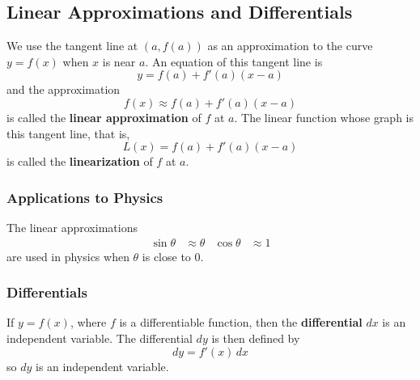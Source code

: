 \subsection{Linear Approximations and Differentials}

We use the tangent line at \((a,f(a))\) as an approximation to the curve
\(y=f(x)\) when \(x\) is near \(a\).
An equation of this tangent line is
\[y=f(a)+f'(a)(x-a)\]
and the approximation
\[f(x)\approx f(a)+f'(a)(x-a)\]
is called the \textbf{linear approximation} of \(f\) at \(a\).
The linear function whose graph is this tangent line, that is,
\[L(x)=f(a)+f'(a)(x-a)\]
is called the \textbf{linearization} of \(f\) at \(a\).

\subsubsection*{Applications to Physics}
The linear approximations
\begin{align*}
    \sin\theta &\approx \theta & \cos\theta &\approx 1
\end{align*}
are used in physics when \(\theta\) is close to 0.

\subsubsection*{Differentials}
If \(y=f(x)\), where \(f\) is a differentiable function, then the
\textbf{differential} \(dx\) is an independent variable.
The differential \(dy\) is then defined by
\[dy=f'(x)\,dx\]
so \(dy\) is an independent variable.
